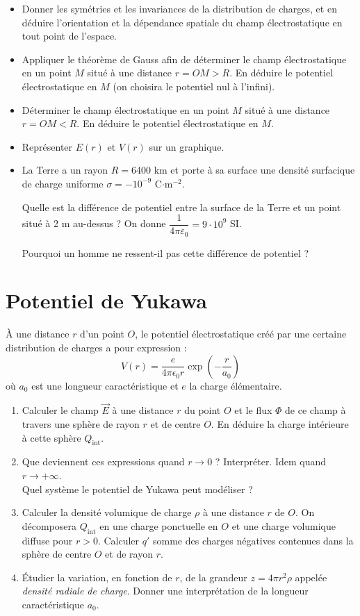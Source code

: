 \documentclass{report}
\begin{document}
\begin{itemize}
\item Donner les symétries et les invariances de la distribution de charges, et en déduire l'orientation et la dépendance spatiale du champ électrostatique en tout point de l'espace.
\item Appliquer le théorème de Gauss afin de déterminer le champ électrostatique en un point $M$ situé à une distance $r=OM>R$. En déduire le potentiel électrostatique en $M$ (on choisira le potentiel nul à l'infini).
\item Déterminer le champ électrostatique en un point $M$ situé à une distance $r=OM<R$. En déduire le potentiel électrostatique en $M$.
\item Représenter $E(r)$ et $V(r)$ sur un graphique.
\item La Terre a un rayon $R=$6400 km et porte à sa surface une densité surfacique de charge uniforme $\sigma=-10^{-9}$ C$\cdot$m$^{-2}$.

Quelle est la différence de potentiel entre la surface de la Terre et un point situé à 2 m au-dessus ? On donne $\dfrac{1}{4\pi\varepsilon_0}=9\cdot 10^9$ SI.

Pourquoi un homme ne ressent-il pas cette différence de potentiel ? %
\end{itemize}

\newpage

\section*{Potentiel de Yukawa}

\`{A} une distance $r$ d'un point $O$, le potentiel électrostatique créé par une certaine distribution de charges a pour expression :
$$
V(r)=\frac{e}{4\pi \epsilon_0r}\exp\left( -\frac{r}{a_0}\right) 
$$
où $a_0$ est une longueur caractéristique et $e$ la charge élémentaire.

\begin{enumerate}
\item Calculer le champ $\vec{E}$ à une distance $r$ du point $O$ et le flux $\Phi$ de ce champ à travers une sphère de rayon $r$ et de centre $O$. En déduire la charge intérieure à cette sphère $Q_{\mathrm{int}}$. 
\item Que deviennent ces expressions quand $r\rightarrow 0$ ? Interpréter. Idem quand $r\rightarrow +\infty$.\\ Quel système le potentiel de Yukawa peut modéliser ?
\item Calculer la densité volumique de charge $\rho$ à une distance $r$ de $O$. On décomposera $Q_{\mathrm{int}}$ en une charge ponctuelle en $O$ et une charge volumique diffuse pour $r>0$. Calculer $q'$ somme des charges négatives contenues dans la sphère de centre $O$ et de rayon $r$.
\item \'{E}tudier la variation, en fonction de $r$, de la grandeur $z=4\pi r^2\rho$ appelée \textit{densité radiale de charge}. Donner une interprétation de la longueur caractéristique $a_0$.
\end{enumerate}
\end{document}
